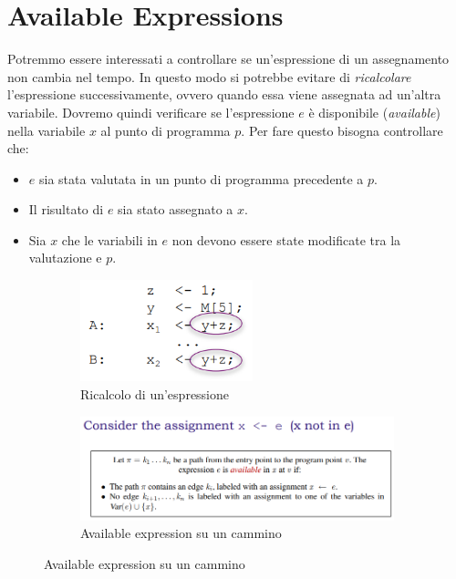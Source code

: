 \documentclass[a4paper,oneside,titlepage]{book}
\begin{document}
\section{Available Expressions}
\label{avail1}
Potremmo essere interessati a controllare se un'espressione di un assegnamento non cambia nel tempo. In questo modo si potrebbe evitare di \textit{ricalcolare} l'espressione successivamente, ovvero quando essa viene assegnata ad un'altra variabile. Dovremo quindi verificare se l'espressione $e$ è disponibile (\textit{available}) nella variabile $x$ al punto di programma $p$. Per fare questo bisogna controllare che:
\begin{itemize}
    \item $e$ sia stata valutata in un punto di programma precedente a $p$.
    \item Il risultato di $e$ sia stato assegnato a $x$.
    \item Sia $x$ che le variabili in $e$ non devono essere state modificate tra la valutazione e $p$.
\end{itemize}
\begin{figure}[htp]
	\begin{subfigure}{0.49\textwidth}
	    \centering
		\includegraphics[width=0.55\textwidth]{availExp1.png}
		\caption{Ricalcolo di un'espressione}
	\end{subfigure}
	\hfill
	\begin{subfigure}{0.49\textwidth}
	    \centering
		\includegraphics[width=\textwidth, height=\textheight, keepaspectratio]{availExp2.png} 
		\caption{Available expression su un cammino}
	\end{subfigure}
\end{figure}
\end{document}
